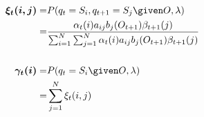 \begin{align}
\boldsymbol{\xi_t(i, j)} =& P(q_t = S_i, q_{t+1} = S_j \given O, \lambda) \nonumber \\
=& \frac{
  \alpha_t(i) a_{ij} b_j(O_{t+1}) \beta_{t+1}(j) }{
  \sum_{i=1}^N \sum_{j=1}^N \alpha_t(i) a_{ij} b_j(O_{t+1}) \beta_{t+1}(j) }
\label{eq:bw:xi} 
%
\\[\baselineskip]
\boldsymbol{\gamma_t(i)} =& P(q_t = S_i \given O, \lambda) \nonumber \\
=& \sum_{j=1}^N \xi_t(i, j)
\label{eq:bw:gamma}
%
\end{align}
